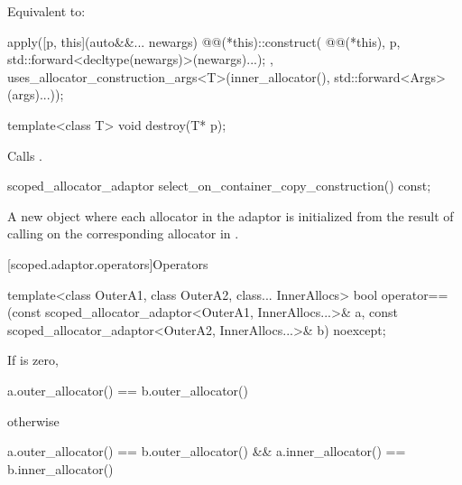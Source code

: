 \begin{itemdescr}
\pnum
\effects
Equivalent to:
\begin{codeblock}
apply([p, this](auto&&... newargs) {
        @@(*this)::construct(
          @@(*this), p,
          std::forward<decltype(newargs)>(newargs)...);
      },
      uses_allocator_construction_args<T>(inner_allocator(),
                                          std::forward<Args>(args)...));
\end{codeblock}
\end{itemdescr}

%
\begin{itemdecl}
template<class T>
  void destroy(T* p);
\end{itemdecl}

\begin{itemdescr}
\pnum
\effects
Calls .
\end{itemdescr}

%
\begin{itemdecl}
scoped_allocator_adaptor select_on_container_copy_construction() const;
\end{itemdecl}

\begin{itemdescr}
\pnum
\returns
A new  object where each allocator  in the
adaptor is initialized from the result of calling
 on the
corresponding allocator in .
\end{itemdescr}

[scoped.adaptor.operators]{Operators}

%
\begin{itemdecl}
template<class OuterA1, class OuterA2, class... InnerAllocs>
  bool operator==(const scoped_allocator_adaptor<OuterA1, InnerAllocs...>& a,
                  const scoped_allocator_adaptor<OuterA2, InnerAllocs...>& b) noexcept;
\end{itemdecl}

\begin{itemdescr}
\pnum
\returns
If  is zero,
\begin{codeblock}
a.outer_allocator() == b.outer_allocator()
\end{codeblock}
otherwise
\begin{codeblock}
a.outer_allocator() == b.outer_allocator() && a.inner_allocator() == b.inner_allocator()
\end{codeblock}
\end{itemdescr}

